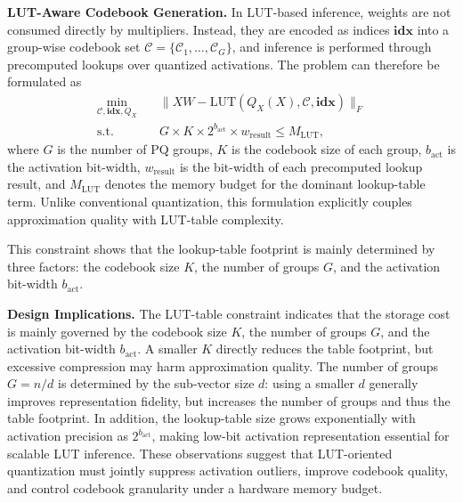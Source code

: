 \textbf{LUT-Aware Codebook Generation.} In LUT-based inference, weights are not consumed directly by multipliers. Instead, they are encoded as indices $\mathbf{idx}$ into a group-wise codebook set $\mathcal{C}=\{\mathcal{C}_1,\ldots,\mathcal{C}_G\}$, and inference is performed through precomputed lookups over quantized activations. The problem can therefore be formulated as
\begin{equation}
\begin{aligned}
\min_{\mathcal{C},\mathbf{idx},Q_X} \quad & \|XW - \mathrm{LUT}(Q_X(X),\mathcal{C},\mathbf{idx})\|_F \\
\text{s.t.} \quad & G \times K \times 2^{b_{\text{act}}} \times w_{\text{result}} \leq M_{\text{LUT}},
\end{aligned}
\end{equation}
where $G$ is the number of PQ groups, $K$ is the codebook size of each group, $b_{\text{act}}$ is the activation bit-width, $w_{\text{result}}$ is the bit-width of each precomputed lookup result, and $M_{\text{LUT}}$ denotes the memory budget for the dominant lookup-table term. Unlike conventional quantization, this formulation explicitly couples approximation quality with LUT-table complexity.

This constraint shows that the lookup-table footprint is mainly determined by three factors: the codebook size $K$, the number of groups $G$, and the activation bit-width $b_{\text{act}}$.

\textbf{Design Implications.} The LUT-table constraint indicates that the storage cost is mainly governed by the codebook size $K$, the number of groups $G$, and the activation bit-width $b_{\text{act}}$. A smaller $K$ directly reduces the table footprint, but excessive compression may harm approximation quality. The number of groups $G=n/d$ is determined by the sub-vector size $d$: using a smaller $d$ generally improves representation fidelity, but increases the number of groups and thus the table footprint. In addition, the lookup-table size grows exponentially with activation precision as $2^{b_{\text{act}}}$, making low-bit activation representation essential for scalable LUT inference. These observations suggest that LUT-oriented quantization must jointly suppress activation outliers, improve codebook quality, and control codebook granularity under a hardware memory budget.

